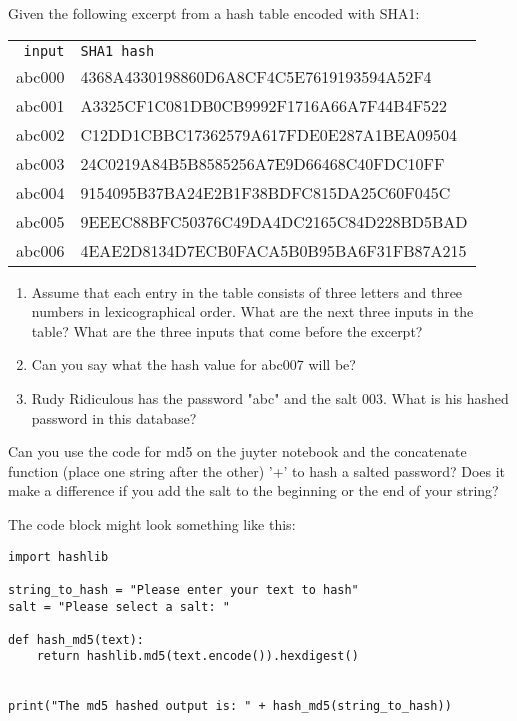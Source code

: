 \documentclass[11pt,a4paper]{report}
\begin{document}
\begin{ex}
Given the following excerpt from a hash table encoded with  SHA1:

\begin{tabular}{rl}
\texttt{input} & \texttt{SHA1 hash} \\
abc000 & 4368A4330198860D6A8CF4C5E7619193594A52F4 \\
abc001 & A3325CF1C081DB0CB9992F1716A66A7F44B4F522 \\
abc002 & C12DD1CBBC17362579A617FDE0E287A1BEA09504 \\
abc003 & 24C0219A84B5B8585256A7E9D66468C40FDC10FF \\ 
abc004 & 9154095B37BA24E2B1F38BDFC815DA25C60F045C \\
abc005 & 9EEEC88BFC50376C49DA4DC2165C84D228BD5BAD \\
abc006 & 4EAE2D8134D7ECB0FACA5B0B95BA6F31FB87A215 
\end{tabular}

\begin{enumerate}
\item Assume that each entry in the table consists of three letters and three numbers in lexicographical order. What are the next three inputs in the table? What are the three inputs that come before the excerpt?
\item Can you say what the hash value for abc007 will be?
\item Rudy Ridiculous has the password "abc" and the salt $003$. What is his hashed password in this database?
\end{enumerate}
\end{ex}

\begin{ex}
Can you use the code for md5 on the juyter notebook and the concatenate function (place one string after the other)  '+' to hash a salted password? Does it make a difference if you add the salt to the beginning or the end of your string?

The code block might look something like this:

\begin{lstlisting}
import hashlib

string_to_hash = "Please enter your text to hash"
salt = "Please select a salt: "

def hash_md5(text):
    return hashlib.md5(text.encode()).hexdigest()


print("The md5 hashed output is: " + hash_md5(string_to_hash))

\end{lstlisting}


\end{ex}
\end{document}
